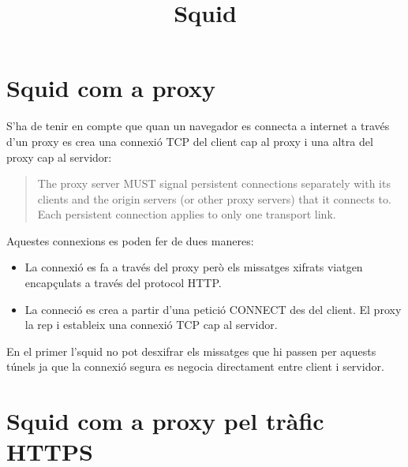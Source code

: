 \documentclass[a4paper]{article}
\begin{document}
\title{Squid}
\maketitle

\begin{comment}
oddsidemargin \the\oddsidemargin \newline
textwidth \the\textwidth \newline
marginparsep \the\marginparsep \newline
marginparwidth \the\marginparwidth \newline
hoffset \the\hoffset \newline
paperwidth \the\paperwidth 
\end{comment}


\section{Squid com a proxy}

S'ha de tenir en compte que quan un navegador es connecta a internet a trav\'es d'un proxy es crea una connexió TCP del client cap al proxy i una altra del proxy cap al servidor:

\begin{quote}
	The proxy server MUST signal persistent connections separately with its clients and the origin servers (or other proxy servers) that it connects to. Each persistent connection applies to only one transport link.\cite{RFC2068}
\end{quote}
Aquestes connexions es poden fer de dues maneres:
\begin{itemize}
	\item La connexió es fa a trav\'es del proxy però els missatges xifrats viatgen encapçulats a trav\'es del protocol HTTP.
	\item La conneció es crea a partir d'una petició CONNECT des del client. El proxy la rep i estableix una connexió TCP cap al servidor.
\end{itemize}
En el primer l'squid no pot desxifrar els missatges que hi passen per aquests túnels ja que la connexió segura es negocia directament entre client i servidor.

\section{Squid com a proxy pel tràfic HTTPS}
\end{document}
